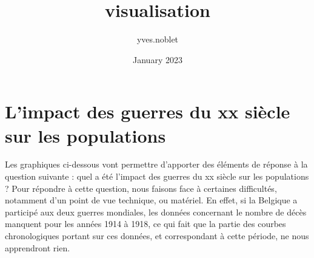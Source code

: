\documentclass{article}
\title{visualisation}
\author{yves.noblet }
\date{January 2023}
\begin{document}
\maketitle

\section{L’impact des guerres du xx siècle sur les populations}
Les graphiques ci-dessous vont permettre d'apporter des éléments de réponse à la question suivante : quel a été l'impact des guerres du xx siècle sur les populations ? 
Pour répondre à cette question, nous faisons face à certaines difficultés, notamment d'un point de vue technique, ou matériel. En effet, si la Belgique a participé aux deux guerres mondiales, les données concernant le nombre de décès manquent pour les années 1914 à 1918, ce qui fait que la partie des courbes chronologiques portant sur ces données, et correspondant à cette période, ne nous apprendront rien. 
\end{document}
